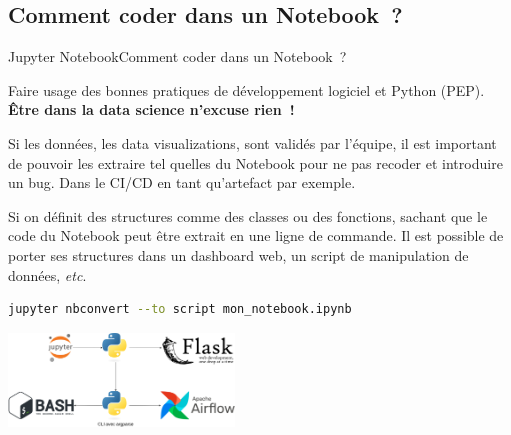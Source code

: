 \documentclass{beamer}
\begin{document}
    \subsection{Comment coder dans un Notebook~?}\label{jupyter-coding-style}
    \begin{frame}[fragile]{Jupyter Notebook}{Comment coder dans un Notebook~?}
        \small
        \begin{dangercolorbox}
            Faire usage des bonnes pratiques de développement logiciel et Python (PEP).
            \textbf{Être dans la data science n'excuse rien~!}

            Si les données, les data visualizations, sont validés par l'équipe, il est important de pouvoir les extraire tel quelles du Notebook pour ne pas recoder et introduire un bug.
            Dans le CI/CD en tant qu'artefact par exemple.
        \end{dangercolorbox}
        \bigbreak
        Si on définit des structures comme des classes ou des fonctions, sachant que le code du Notebook peut être extrait en une ligne de commande.
        Il est possible de porter ses structures dans un dashboard web, un script de manipulation de données, \textit{etc}.
        \begin{lstlisting}[language=bash]
jupyter nbconvert --to script mon_notebook.ipynb
        \end{lstlisting}
        \begin{center}
            \includegraphics[width=6cm]{image/from-notebook-to-production}
        \end{center}
    \end{frame}
\end{document}
